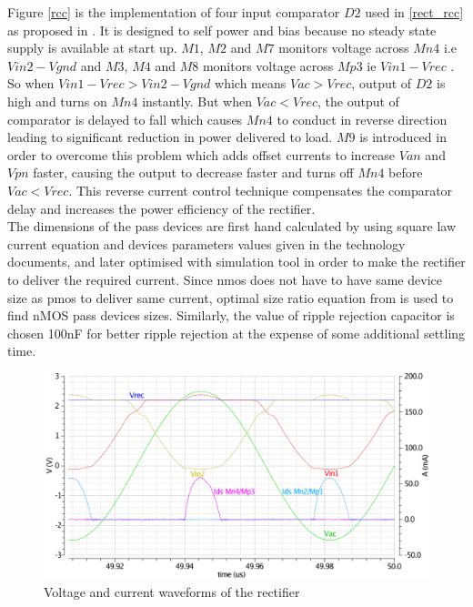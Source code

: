 \documentclass[12pt,a4paper,UKenglish]{article}
\begin{document}
Figure \ref{rcc}  is the implementation of four input comparator $D2$ used in \ref{rect_rcc} as proposed in \cite{rectrcc}. It is designed to self power and bias because no steady state supply is available at start up. $M1$, $M2$ and $M7$ monitors voltage across $Mn4$ i.e $Vin2 - Vgnd$ and $M3$, $M4$ and $M8$ monitors voltage across $Mp3$ ie $Vin1 - Vrec$ . So when $Vin1 - Vrec > Vin2 - Vgnd$ which means $Vac > Vrec$, output of $D2$ is high and turns on $Mn4$ instantly. But when $Vac < Vrec$, the output of comparator is delayed to fall which causes $Mn4$ to conduct in reverse direction leading to significant reduction in power delivered to load. $M9$ is introduced in order to overcome this problem which adds offset currents to increase $Van$ and $Vpn$ faster, causing the output to decrease faster and turns off $Mn4$ before $Vac < Vrec$. This reverse current control technique compensates the comparator delay and increases the power efficiency of the rectifier. \\

The dimensions of the pass devices are first hand calculated by using square law current equation and devices parameters values given in the technology documents, and later optimised with simulation tool in order to make the rectifier to deliver the required current. Since \acrshort{nmos} does not have to have same device size as \acrshort{pmos} to deliver same current, optimal size ratio equation from \cite{rectsize} is used to find nMOS pass devices sizes.
Similarly, the value of ripple rejection capacitor is chosen 100nF for better ripple rejection at the expense of some additional settling time.

\begin{figure}[htbp] %
   \centering
   \includegraphics[width=.9\textwidth]{img/rect_output.pdf} 
   \caption{Voltage and current waveforms of the rectifier}
   \label{rect_plot}
\end{figure}
\end{document}
